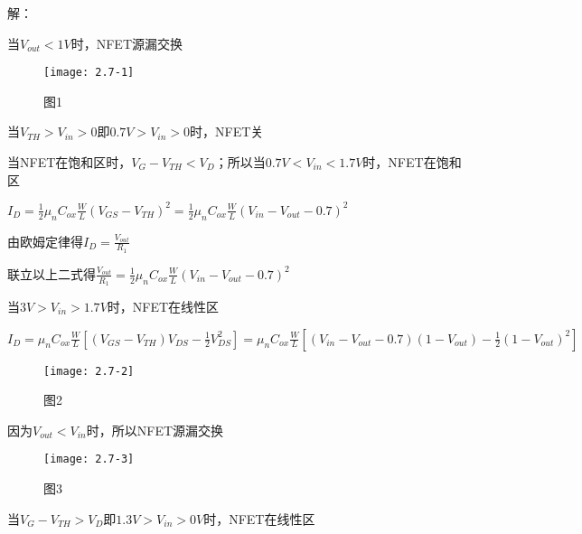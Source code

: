 


解：

\scalebox{3}{（a）}

当$V_{out}<1V$时，NFET源漏交换

		\begin{figure}[H] %
	\begin{minipage}{\linewidth}
		\texttt{[image: 2.7-1]}
	\end{minipage}
	\caption*{图1} %
\end{figure}

当$V_{TH}>V_{in}>0$即$0.7V>V_{in}>0$时，NFET关

当NFET在饱和区时，$V_{G}-V_{TH}<V_{D}$；所以当$0.7V<V_{in}<1.7V$时，NFET在饱和区

$I_D=\frac{1}{2}\mu_nC_{ox}\frac{W}{L}(V_{GS}-V_{TH})^2=\frac{1}{2}\mu_nC_{ox}\frac{W}{L}(V_{in}-V_{out}-0.7)^2$

由欧姆定律得$I_D=\frac{V_{out}}{R_1}$

联立以上二式得$\frac{V_{out}}{R_1}=\frac{1}{2}\mu_nC_{ox}\frac{W}{L}(V_{in}-V_{out}-0.7)^2$

当$3V>V_{in}>1.7V$时，NFET在线性区

$I_D=\mu_nC_{ox}\frac{W}{L}[(V_{GS}-V_{TH})V_{DS}-\frac{1}{2}V_{DS}^2]=\mu_nC_{ox}\frac{W}{L}[(V_{in}-V_{out}-0.7)(1-V_{out})-\frac{1}{2}(1-V_{out})^2]$

		\begin{figure}[H] %
	\begin{minipage}{\linewidth}
		\texttt{[image: 2.7-2]}
	\end{minipage}
	\caption*{图2} %
\end{figure}

\scalebox{3}{（b）}

因为$V_{out}<V_{in}$时，所以NFET源漏交换

		\begin{figure}[H] %
	\begin{minipage}{\linewidth}
		\texttt{[image: 2.7-3]}
	\end{minipage}
	\caption*{图3} %
\end{figure}

当$V_{G}-V_{TH}>V_{D}$即$1.3V>V_{in}>0V$时，NFET在线性区

